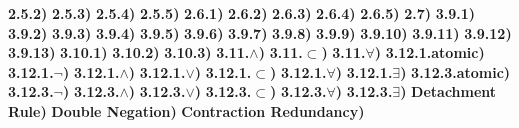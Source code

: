 \documentclass{article}
\begin{document}
{\bf 2.5.2)} 
{\bf 2.5.3)} 
{\bf 2.5.4)} 
\break
{\bf 2.5.5)} 
{\bf 2.6.1)} 
{\bf 2.6.2)} 
\break
{\bf 2.6.3)} 
{\bf 2.6.4)} 
{\bf 2.6.5)} 
{\bf 2.7)} 
{\bf 3.9.1)} 
{\bf 3.9.2)} 
{\bf 3.9.3)} 
{\bf 3.9.4)} 
{\bf 3.9.5)} 
{\bf 3.9.6)} 
\break
{\bf 3.9.7)} 
{\bf 3.9.8)} 
{\bf 3.9.9)} 
{\bf 3.9.10)} 
{\bf 3.9.11)} 
{\bf 3.9.12)} 
{\bf 3.9.13)} 
{\bf 3.10.1)} 
{\bf 3.10.2)} 
{\bf 3.10.3)} 
{\bf 3.11.$\land$)} 
{\bf 3.11.$\subset$)} 
{\bf 3.11.$\forall$)} 
\break
{\bf 3.12.1.atomic)} 
{\bf 3.12.1.$\neg$)} 
{\bf 3.12.1.$\land$)} 
{\bf 3.12.1.$\lor$)} 
{\bf 3.12.1.$\subset$)} 
\break
{\bf 3.12.1.$\forall$)} 
{\bf 3.12.1.$\exists$)} 
{\bf 3.12.3.atomic)} 
{\bf 3.12.3.$\neg$)} 
\break
{\bf 3.12.3.$\land$)} 
{\bf 3.12.3.$\lor$)} 
{\bf 3.12.3.$\subset$)} 
{\bf 3.12.3.$\forall$)} 
\break
{\bf 3.12.3.$\exists$)} 
\break
{\bf Detachment Rule)} 
{\bf Double Negation)} 
{\bf Contraction Redundancy)} 
\end{document}
